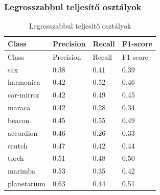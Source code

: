 \subsubsection{Legrosszabbul teljesítő osztályok}
  \begin{center}
    \begin{longtable}{llll}
    \caption{Legrosszabbul teljesítő osztályok}\label{tab:phase02_ViT-B-16_legrosszabb_osztlyok}\\
    \toprule
    Class & Precision & Recall & F1-score \\
    \midrule
    \endfirsthead
    \toprule
    Class & Precision & Recall & F1-score \\
    \midrule
    \endhead
    sax & 0.38 & 0.41 & 0.39 \\
    harmonica & 0.42 & 0.52 & 0.46 \\
    car-mirror & 0.42 & 0.49 & 0.45 \\
    maraca & 0.42 & 0.28 & 0.34 \\
    beacon & 0.45 & 0.55 & 0.49 \\
    accordion & 0.46 & 0.26 & 0.33 \\
    crutch & 0.47 & 0.42 & 0.44 \\
    torch & 0.51 & 0.48 & 0.50 \\
    marimba & 0.53 & 0.35 & 0.42 \\
    planetarium & 0.63 & 0.44 & 0.51 \\
    \bottomrule
    \end{longtable}
  \end{center}